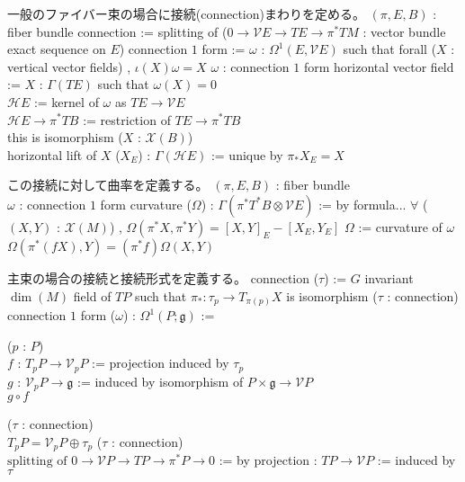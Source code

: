 \begin{Definition}
\itemnote
  一般のファイバー束の場合に接続(connection)まわりを定める。
\itemwhen \((\pi , E , B)\) : fiber bundle
\itemdefi
  \Define connection := splitting of (\(0 \to \mathcal{V}E \to TE \to \pi^*TM\) : vector bundle exact sequence on \(E\))
\itemdefi
  \Define connection \(1\) form := \(\omega\) : \(\Omega^1(E , \mathcal{V}E)\) such that
  forall (\(X\) : vertical vector fields) , \(\iota(X)\omega = X\)
\itemwhen \(\omega\) : connection \(1\) form
\itemdefi
  \Define horizontal vector field := \(X\) : \(\Gamma(TE)\) such that \(\omega(X) = 0\) \\
  \Define \(\mathcal{H}E\) := kernel of \(\omega\) as \(TE \to \mathcal{V}E\) \\
\itemprop
  \Let \(\mathcal{H}E \to \pi^* TB\) := restriction of \(TE \to \pi^*TB\) \\
  \Then this is isomorphism
\itemdefi
  \For (\(X\) : \(\mathcal{X}(B)\)) \\
  \Define horizontal lift of \(X\) (\(X_E\)) : \(\Gamma(\mathcal{H}E)\) := unique by \(\pi_* X_E = X\)
\end{Definition}

\begin{Definition}
\itemnote
  この接続に対して曲率を定義する。
\itemwhen
  \Fix \((\pi , E , B)\) : fiber bundle \\
  \Fix \(\omega\) : connection \(1\) form
\itemdefi
  \Define curvature (\(\Omega\)) : \(\Gamma(\pi^*T^*B \otimes \mathcal{V}E)\) := by formula...
  \(\forall\) (\((X , Y)\) : \(\mathcal{X}(M)\)) , \(\Omega(\pi^*X , \pi^*Y) = [X , Y]_E - [X_E , Y_E]\)
\itemprop
  \Let \(\Omega\) := curvature of \(\omega\) \\
  \Then \(\Omega(\pi^*(f X) , Y) = (\pi^* f) \Omega(X , Y)\)
\end{Definition}

\begin{Definition}
\itemnote
  主束の場合の接続と接続形式を定義する。
\itemdefi
  \Define connection (\(\tau\)) := \(G\) invariant \(\dim (M)\) field of \(TP\) such that \(\pi_* : \tau_p \to T_{\pi(p)}X\) is isomorphism
\itemdefi
  \For (\(\tau\) : connection) \\
  \Define connection \(1\) form (\(\omega\)) : \(\Omega^1(P ; \mathfrak{g})\) :=
  \begin{indentblock}
    \For (\(p\) : \(P\)) \\
    \Let \(f\) : \(T_p P \to \mathcal{V}_p P\) := projection induced by \(\tau_p\) \\
    \Let \(g\) : \(\mathcal{V}_p P \to \mathfrak{g}\) := induced by isomorphism of \(P \times \mathfrak{g} \to \mathcal{V}P\) \\
    \Return \(g \circ f\)
  \end{indentblock}
\itemprop
  \For (\(\tau\) : connection) \\
  \Then \(T_p P = \mathcal{V}_p P \oplus \tau_p\)
\itemdefi
  \For (\(\tau\) : connection) \\
  \Define \(\text{splitting of } 0 \to \mathcal{V}P \to TP \to \pi^*P \to 0\) := by projection : \(TP \to \mathcal{V}P\) := induced by \(\tau\)
\end{Definition}


